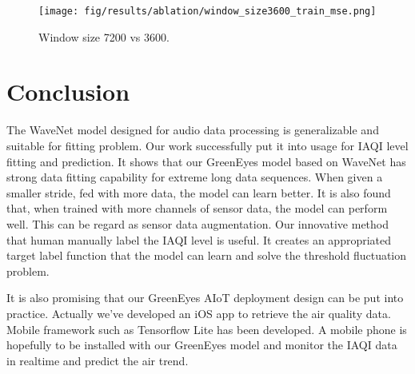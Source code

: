 \documentclass[
twocolumn,
]{ceurart}
\begin{document}
\begin{figure}[!htbp]
    \centering
    \texttt{[image: fig/results/ablation/window\_size3600\_train\_mse.png]}
    \caption{Window size 7200 vs 3600.}
    \label{fig:window_size3600_train_mse}
\end{figure}


\section{Conclusion}

The WaveNet model designed for audio data processing is generalizable and suitable for fitting problem. Our work successfully put it into usage for IAQI level fitting and prediction. It shows that our GreenEyes model based on WaveNet has strong data fitting capability for extreme long data sequences. When given a smaller stride, fed with more data, the model can learn better. It is also found that, when trained with more channels of sensor data, the model can perform well. This can be regard as sensor data augmentation. Our innovative method that human manually label the IAQI level is useful. It creates an appropriated target label function that the model can learn and solve the threshold fluctuation problem.




It is also promising that our GreenEyes AIoT deployment design can be put into practice. Actually we've developed an iOS app to retrieve the air quality data. Mobile framework such as Tensorflow Lite \cite{louis2019towards} has been developed. A mobile phone is hopefully to be installed with our GreenEyes model and monitor the IAQI data in realtime and predict the air trend.
\end{document}
